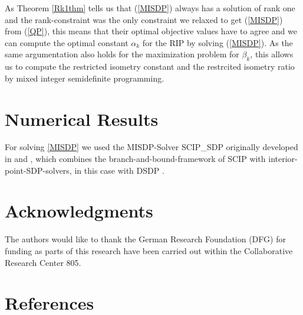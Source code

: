 \documentclass[a4paper,11pt,1p]{elsarticle}
\begin{document}
As Theorem \ref{Rk1thm} tells us that (\ref{MISDP}) always has a solution of rank one and the rank-constraint was the only constraint we relaxed to get (\ref{MISDP}) from (\ref{QP}), this means that their optimal objective values 
have to agree and we can compute the optimal constant $\alpha_k$ for the RIP by solving (\ref{MISDP}). As the same argumentation also holds for the maximization problem for $\beta_k$, this allows us to compute the restricted isometry
constant and the restrcited isometry ratio by mixed integer semidefinite programming.

\section{Numerical Results}

For solving \ref{MISDP} we used the MISDP-Solver SCIP\_SDP originally developed in \cite{MS12} and \cite{Mar13}, which combines the branch-and-bound-framework of SCIP \cite{SCIP} with interior-point-SDP-solvers, in this case 
with DSDP \cite{DSDP}.

\section*{Acknowledgments}
The authors would like to thank the German Research Foundation (DFG) for funding as parts of this research have been carried out within the Collaborative Research Center 805.

\section*{References}


\end{document}
